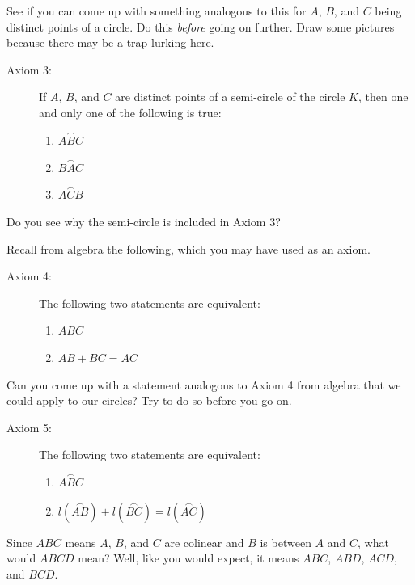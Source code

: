 \documentclass[english]{book}
\newcommand{\arc}[1]{\overset{\frown}{#1} }
\begin{document}
See if you can come up with something analogous to this for $A$, $B$, and $C$ being distinct points of a circle. Do this \emph{before} going on further. Draw some pictures because there may be a trap lurking here.

\begin{description}
\item[Axiom 3:] If $A$, $B$, and $C$ are distinct points of a semi-circle of the circle $K$, then one and only one of the following is true:
  \begin{enumerate}[\hspace{1cm}1)]
    \item $\arc{ABC}$ 
    \item $\arc{BAC}$
    \item $\arc{ACB}$
  \end{enumerate}
\end{description}

Do you see why the semi-circle is included in Axiom 3?

Recall from algebra the following, which you may have used as an axiom.

\begin{description}
\item[Axiom 4:] The following two statements are equivalent:
  \begin{enumerate}[\hspace{1cm}1)]
    \item $ABC$
    \item $AB + BC = AC$
  \end{enumerate}
\end{description}

Can you come up with a statement analogous to Axiom 4 from algebra that we could apply to our circles? Try to do so before you go on.

\begin{description}
\item[Axiom 5:] The following two statements are equivalent:
  \begin{enumerate}[\hspace{1cm}1)]
    \item $\arc{ABC}$
    \item $l(\arc{AB}) + l(\arc{BC}) = l(\arc{AC})$
  \end{enumerate}
\end{description}

Since $ABC$ means $A$, $B$, and $C$ are colinear and $B$ is between $A$ and $C$, what would $ABCD$ mean? Well, like you would expect, it means $ABC$, $ABD$, $ACD$, and $BCD$. 
\end{document}
